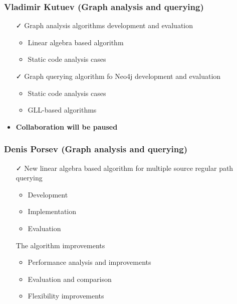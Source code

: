 \documentclass[xcolor=table,aspectratio=169]{beamer}
\begin{document}
\begin{frame}[fragile]
  \frametitle{Vladimir Kutuev (Graph analysis and querying)}
  \begin{minipage}[t]{0.48\textwidth}
    \begin{itemize}
      \item[\faCheck] Graph analysis algorithms development and evaluation
      \begin{itemize}
        \item Linear algebra based algorithm
        \item Static code analysis cases
      \end{itemize}
      \item[\faCheck] Graph querying algorithm fo Neo4j development and evaluation
      \begin{itemize}
        \item Static code analysis cases
        \item GLL-based algorithms
      \end{itemize}
    \end{itemize}
  \end{minipage}
  \pause
  \begin{minipage}[t]{0.48\textwidth}
    \begin{itemize}
      \item \textbf{Collaboration will be paused}
    \end{itemize}
  \end{minipage}
\end{frame}

\begin{frame}[fragile]
  \frametitle{Denis Porsev (Graph analysis and querying)}
  \begin{minipage}[t]{0.48\textwidth}
    \begin{itemize}
      \item[\faCheck] New linear algebra based algorithm for multiple source regular path querying
      \begin{itemize}
        \item Development
        \item Implementation
        \item Evaluation
      \end{itemize}      
    \end{itemize}
  \end{minipage}
  \pause
  \begin{minipage}[t]{0.48\textwidth}
    \begin{itemize}
      \item[\faHourglassHalf] The algorithm improvements
      \begin{itemize}
        \item Performance analysis and improvements
        \item Evaluation and comparison
        \item Flexibility improvements
      \end{itemize}      
    \end{itemize}
  \end{minipage}
\end{frame}
\end{document}

